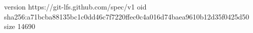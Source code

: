 version https://git-lfs.github.com/spec/v1
oid sha256:a71bcba88135bc1c0dd46c7f7220ffec0c4a016d74baea9610b12d35f0425d50
size 14690

